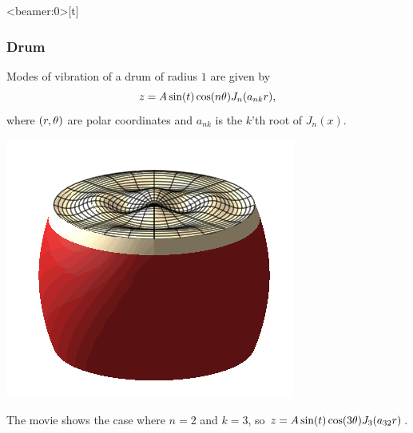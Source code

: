 \documentclass[9pt]{beamer}
\begin{document}
\begin{frame}<beamer:0>[t]
 \frametitle{Drum}

 Modes of vibration of a drum of radius $1$ are given by 
 \[ z = A\sin(t)\cos(n\theta)J_n(a_{nk}r), \]
 where $(r,\theta)$ are polar coordinates  and $a_{nk}$ is
 the $k$'th root of $J_n(x)$.

 \begin{center}
  \includegraphics[scale=0.4]{video/bm_2_3/bd-42.png}
 \end{center}

 The movie shows the case where $n=2$ and $k=3$, so 
 $z=A\sin(t)\cos(3\theta)J_3(a_{32}r)$.
\end{frame}
\end{document}
